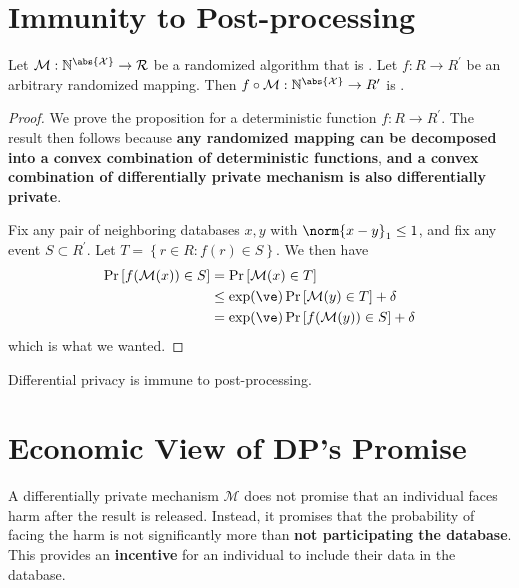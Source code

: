 \section{Immunity to Post-processing}
\begin{proposition}
    Let \(\cal{M}: \mathbb{N}^{\abs{\mathcal{X}}} \rightarrow R \) be a randomized algorithm that is \dip{\(\ve\)}{\(\delta\)}. Let \(f: R \rightarrow R^\prime \) be an arbitrary randomized mapping. Then \( f \circ \mathcal{M}: \mathbb{N}^{\abs{\mathcal{X}}} \to R^\prime \) is \dip{\(\ve\)}{\(\delta\)}.
    \begin{proof}
        We prove the proposition for a deterministic function \(f: R \to R^\prime\). The result then follows because \textbf{any randomized mapping can be decomposed into a convex combination of deterministic functions}, \textbf{and a convex combination of differentially private mechanism is also differentially private}.

        Fix any pair of neighboring databases \(x, y\) with \(\norm{x - y}_1 \le 1 \), and fix any event \(S \subset R^\prime\). Let \(T = \left\{r \in R : f(r) \in S \right\}\). We then have
        \begin{align*}
            \Pr \left[f(\mathcal{M}(x)) \in S   \right] &= \Pr \left[\mathcal{M}(x) \in T\right]
            \\ &\le \exp(\ve) \Pr \left[\mathcal{M}(y) \in T\right] + \delta
            \\ &= \exp(\ve) \Pr \left[f(\mathcal{M}(y)) \in S\right] + \delta
        \end{align*}
        which is what we wanted.
    \end{proof}

    \begin{remark}
        Differential privacy is immune to post-processing.
    \end{remark}
\end{proposition}
\section{Economic View of DP's Promise}
A differentially private mechanism \(\mathcal{M}\) does not promise that an individual faces harm after the result is released. Instead, it promises that the probability of facing the harm is not significantly more than \textbf{not participating the database}. This provides an \textbf{incentive} for an individual to include their data in the database.

